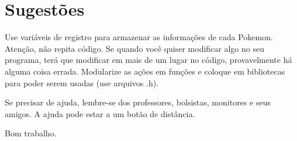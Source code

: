 \documentclass[12pt]{article}
\begin{document}
\section{Sugestões}
Use variáveis de registro para armazenar as informações de cada Pokemon.\\

Atenção, não repita código. Se quando você quiser modificar algo no seu programa, terá que modificar em mais de um lugar no código, provavelmente há alguma coisa errada. Modularize as ações em funções e coloque em bibliotecas para poder serem usadas (use arquivos .h).

Se precisar de ajuda, lembre-se dos professores, bolsistas, monitores e seus amigos. A ajuda pode estar a um botão de distância.

Bom trabalho.

\end{document}
